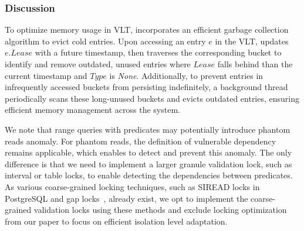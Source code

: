 \subsubsection{Discussion} 
To optimize memory usage in VLT, \sysname incorporates an efficient garbage collection algorithm to evict cold entries. Upon accessing an entry \( e \) in the VLT, \sysname updates \( e.Lease \) with a future timestamp, then traverses the corresponding bucket to identify and remove outdated, unused entries where \( Lease \) falls behind than the current timestamp and \( Type \) is \textit{None}. 
Additionally, to prevent entries in infrequently accessed buckets from persisting indefinitely, a background thread periodically scans these long-unused buckets and evicts outdated entries, ensuring efficient memory management across the system. 

We note that range queries with predicates may potentially introduce phantom reads anomaly. 
For phantom reads, the definition of vulnerable dependency remains applicable, which enables \sysname to detect and prevent this anomaly. 
The only difference is that we need to implement a larger granule validation lock, such as interval or table locks, to enable detecting the dependencies between predicates. 
As various coarse-grained locking techniques, such as SIREAD locks in PostgreSQL and gap locks~\cite{DBLP:conf/vldb/Lomet93}, already exist, we opt to implement the coarse-grained validation locks using these methods and exclude locking optimization from our paper to focus on efficient isolation level adaptation. 

